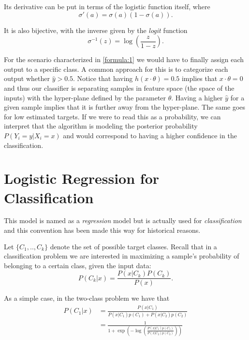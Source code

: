 Its derivative can be put in terms of the logistic function itself, where
\begin{equation}\label{eq:derivativeLogisticFunction}
\sigma '(a) = \sigma(a)( 1 - \sigma(a) ) .
\end{equation}

It is also bijective, with the inverse given by the \textit{logit} function
\begin{equation}\label{eq:logitFunction}
\sigma^{-1}(z) = \log( \frac{z}{1 - z}) .
\end{equation}

For the scenario characterized in \cref{formula:1} we would have to finally assign each output to a specific class. A common approach for this is to categorize each output whether $\hat{y} > 0.5$\label{formula:logitThreshold}. Notice that having $h(x \cdot \theta) = 0.5$ implies that $x \cdot \theta = 0$ and thus our classifier is separating samples in feature space (the space of the inputs) with the hyper-plane defined by the parameter $\theta$. Having a higher $\hat{y}$ for a given sample implies that it is further away from the hyper-plane. The same goes for low estimated targets. If we were to read this as a probability, we can interpret that the algorithm is modeling the posterior probability $P(Y_i = y | X_i = x)$ and would correspond to having a higher confidence in the classification.




\section{Logistic Regression for Classification}\label{section-logisticRegression}

This model is named as a \textit{regression} model but is actually used for \textit{classification} and this convention has been made this way for historical reasons.


Let $\{C_1,..,C_k\}$ denote the set of possible target classes. Recall that in a classification problem we are interested in maximizing a sample's probability of belonging to a certain class, given the input data:
\begin{equation}
P(C_k| x) = \frac{P(x|C_k)P(C_k)}{P(x)} .
\end{equation}

As a simple case, in the two-class problem we have that
\begin{equation}
\begin{split}
P(C_1| x) & = \frac{P(x|C_1) }{P(x|C_1)p(C_1) + P(x|C_2)p(C_2)} \\
& = \frac{1 }
{1 + \exp(- \log(  \frac{ P(x|C_1)p(C_1)}
{P(x|C_2)p(C_2)
})) 
}
\end{split}
\end{equation}

